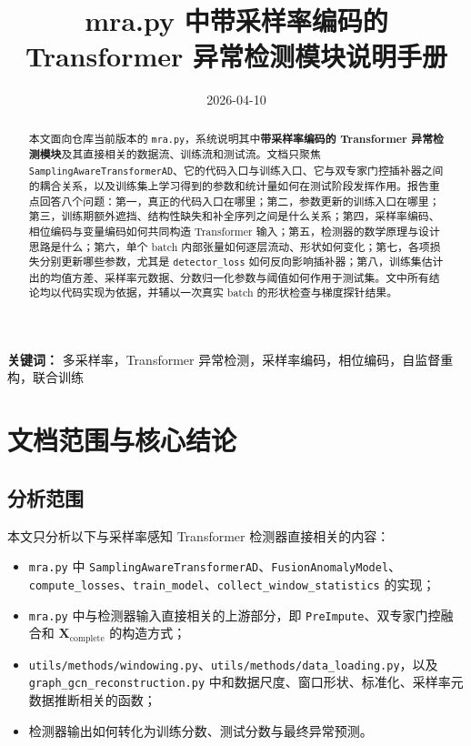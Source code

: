 \documentclass[UTF8]{ctexart}
\title{mra.py 中带采样率编码的 Transformer 异常检测模块说明手册}
\author{}
\date{2026-04-10}
\begin{document}
\maketitle

\begin{abstract}
本文面向仓库当前版本的 \texttt{mra.py}，系统说明其中\textbf{带采样率编码的 Transformer 异常检测模块}及其直接相关的数据流、训练流和测试流。文档只聚焦 \texttt{SamplingAwareTransformerAD}、它的代码入口与训练入口、它与双专家门控插补器之间的耦合关系，以及训练集上学习得到的参数和统计量如何在测试阶段发挥作用。报告重点回答八个问题：第一，真正的代码入口在哪里；第二，参数更新的训练入口在哪里；第三，训练期额外遮挡、结构性缺失和补全序列之间是什么关系；第四，采样率编码、相位编码与变量编码如何共同构造 Transformer 输入；第五，检测器的数学原理与设计思路是什么；第六，单个 batch 内部张量如何逐层流动、形状如何变化；第七，各项损失分别更新哪些参数，尤其是 \texttt{detector\_loss} 如何反向影响插补器；第八，训练集估计出的均值方差、采样率元数据、分数归一化参数与阈值如何作用于测试集。文中所有结论均以代码实现为依据，并辅以一次真实 batch 的形状检查与梯度探针结果。
\end{abstract}

\noindent\textbf{关键词：} 多采样率，Transformer 异常检测，采样率编码，相位编码，自监督重构，联合训练

\tableofcontents
\newpage

\section{文档范围与核心结论}

\subsection{分析范围}

本文只分析以下与采样率感知 Transformer 检测器直接相关的内容：
\begin{itemize}
    \item \texttt{mra.py} 中 \texttt{SamplingAwareTransformerAD}、\texttt{FusionAnomalyModel}、\texttt{compute\_losses}、\texttt{train\_model}、\texttt{collect\_window\_statistics} 的实现；
    \item \texttt{mra.py} 中与检测器输入直接相关的上游部分，即 \texttt{PreImpute}、双专家门控融合和 \(\bm{X}_{\text{complete}}\) 的构造方式；
    \item \texttt{utils/methods/windowing.py}、\texttt{utils/methods/data\_loading.py}，以及\\
    \texttt{graph\_gcn\_reconstruction.py} 中和数据尺度、窗口形状、标准化、采样率元数据推断相关的函数；
    \item 检测器输出如何转化为训练分数、测试分数与最终异常预测。
\end{itemize}
\end{document}
